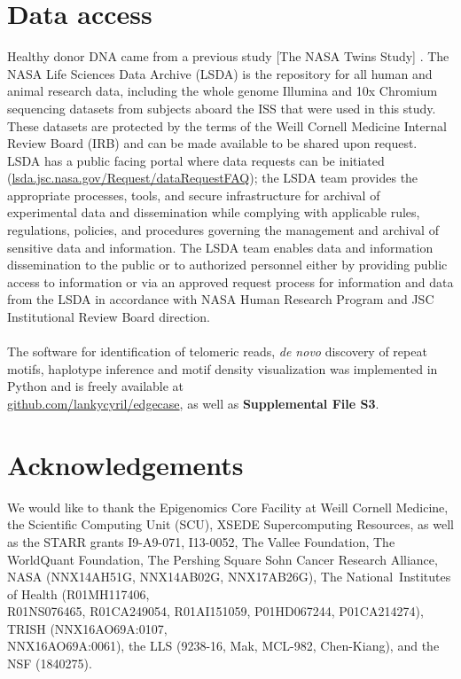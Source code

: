 \documentclass{article}
\begin{document}
\section*{Data access} 
Healthy donor DNA came from a previous study [The NASA Twins Study] \parencite{twins_study}.
The NASA Life Sciences Data Archive (LSDA) is the repository for all human and animal research data, including the whole genome Illumina and 10x Chromium sequencing datasets from subjects aboard the ISS that were used in this study.
These datasets are protected by the terms of the Weill Cornell Medicine Internal Review Board (IRB) and can be made available to be shared upon request.
LSDA has a public facing portal where data requests can be initiated (\href{https://lsda.jsc.nasa.gov/Request/dataRequestFAQ}{lsda.jsc.nasa.gov/Request/dataRequestFAQ});
the LSDA team provides the appropriate processes, tools, and secure infrastructure for archival of experimental data and dissemination while complying with applicable rules, regulations, policies, and procedures governing the management and archival of sensitive data and information.
The LSDA team enables data and information dissemination to the public or to authorized personnel either by providing public access to information or via an approved request process for information and data from the LSDA in accordance with NASA Human Research Program and JSC Institutional Review Board direction.
\\~\\
The software for identification of telomeric reads, \textit{de novo} discovery of repeat motifs, haplotype inference and motif density visualization was implemented in Python and is freely available at \\%
\href{https://github.com/lankycyril/edgecase}{github.com/lankycyril/edgecase},
as well as \textbf{Supplemental File S3}.

\section*{Acknowledgements} 
We would like to thank
the Epigenomics Core Facility at Weill Cornell Medicine,
the Scientific Computing Unit (SCU),
XSEDE Supercomputing Resources,
as well as
the STARR grants I9-A9-071, I13-0052,
The Vallee Foundation,
The WorldQuant Foundation,
The Pershing Square Sohn Cancer Research Alliance,
NASA (NNX14AH51G, NNX14AB02G, NNX17AB26G),
The National Institutes of Health (R01MH117406, \\%
R01NS076465, R01CA249054, R01AI151059, P01HD067244, P01CA214274),
TRISH (NNX16AO69A:0107, \\%
NNX16AO69A:0061),
the LLS (9238-16, Mak, MCL-982, Chen-Kiang),
and
the NSF (1840275).
\end{document}
